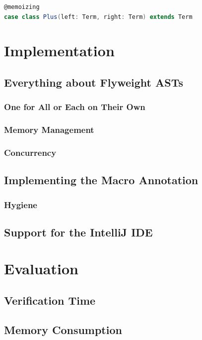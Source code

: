 \documentclass[11pt]{article}
\begin{document}
    \begin{lstlisting}[language=Scala, caption=One possible way to use macro annotations to automatically generate code in listing 3.]
@memoizing
case class Plus(left: Term, right: Term) extends Term
    \end{lstlisting}

    \section{Implementation}

    \subsection{Everything about Flyweight ASTs}

    \subsubsection{One for All or Each on Their Own}

    \subsubsection{Memory Management}

    \subsubsection{Concurrency}

    \subsection{Implementing the Macro Annotation}

    \subsubsection{Hygiene}

    \subsection{Support for the IntelliJ IDE}

    \section{Evaluation}

    \subsection{Verification Time}

    \subsection{Memory Consumption}


    \printbibliography
    
\end{document}
